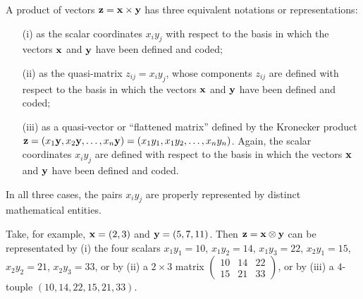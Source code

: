 A product of vectors ${\bf z} = {\bf x} \times {\bf y}$
has three equivalent notations or representations:
\begin{itemize}
\item[(i)]
as the scalar coordinates $x_iy_j$ with respect to the basis in which the vectors ${\bf  x}$ and ${\bf y}$ have been defined and coded;
\item[(ii)]
as the quasi-matrix $z_{ij}  =x_iy_j$, whose components $z_{ij}$ are  defined with respect to the basis in which the vectors ${\bf  x}$ and ${\bf y}$ have been defined and coded;
\item[(iii)]
as a quasi-vector or ``flattened matrix'' defined by the Kronecker product
${\bf z} = ({ x}_1  {\bf y}, { x}_2  {\bf y}, \ldots , { x}_n  {\bf y})=
({ x}_1  { y}_1, { x}_1  { y}_2, \ldots , { x}_n  { y}_n)
$. Again, the scalar coordinates $x_iy_j$ are defined
with respect to the basis in which the vectors ${\bf  x}$ and ${\bf y}$ have been defined and coded.
\end{itemize}
In all three cases, the pairs $x_i y_j$  are properly represented by distinct mathematical entities.

{\color{blue}
\bexample
Take, for example,
${\bf x}=(2,3)$
and
${\bf y}=(5,7,11)$.
Then ${\bf z} = {\bf x} \otimes {\bf y}$  can be representated by
(i) the four scalars
$x_1y_1=10$,
$x_1y_2=14$,
$x_1y_3=22$,
$x_2y_1=15$,
$x_2y_2=21$,
$x_2y_3=33$,
or by
(ii) a $2 \times 3$ matrix
$
\begin{pmatrix}
10&14&22\\
15&21&33
\end{pmatrix}
$,
or by
(iii) a $4$-touple
$
(10,14,22,15,21,33)
$.
\eexample
}

